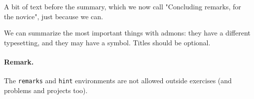 \documentclass[%
oneside,                 %
final,                   %
10pt]{article}
\newenvironment{summaryshaded}
{\def\FrameCommand{\fboxsep=3mm\colorbox{yellowicon_summary_background}}
 \MakeFramed {\advance\hsize-\width \FrameRestore}}{\endMakeFramed}
\newenvironment{summary_yellowiconadmon}[1][Summary]{
\begin{summaryshaded}
\noindent
\begin{figure}
\vspace{-13pt}
\texttt{[image: latex\_figs/small\_yellow\_summary]}
\end{figure} \textbf{#1}\par
\nobreak\noindent\ignorespaces
}
{
\end{summaryshaded}
}
\begin{document}
A bit of text before the summary, which we now call "Concluding remarks,
for the novice",
just because we can.


\begin{summary_yellowiconadmon}
We can summarize the most important things with admons: they have
a different typesetting, and they may have a symbol.
Titles should be optional.
\end{summary_yellowiconadmon} %



\paragraph{Remark.}
The \texttt{remarks} and \texttt{hint} environments are not allowed outside
exercises (and problems and projects too).


\end{document}
